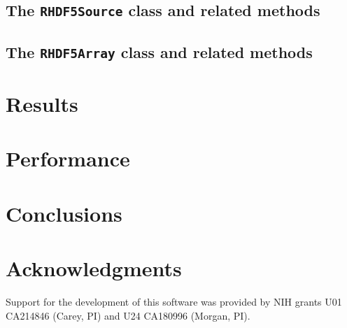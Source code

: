 \documentclass[applications]{gen-bioinformatics}
\begin{document}
\subsection*{The \texttt{RHDF5Source} class and related methods}

\subsection*{The \texttt{RHDF5Array} class and related methods}

\section*{Results}

\section*{Performance}

\section*{Conclusions}

\section*{Acknowledgments}
Support for the development of this software was provided by NIH grants
U01 CA214846 (Carey, PI) and U24 CA180996 (Morgan, PI).


\end{document}

